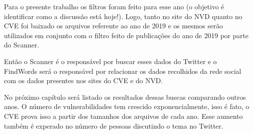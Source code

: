 Para o presente trabalho os filtros foram feito para esse ano (o objetivo é identificar como a discussão está hoje!). Logo, tanto no site do NVD quanto no CVE foi baixado os arquivos referente ao ano de 2019 e os mesmos serão utilizados em conjunto com o filtro feito de publicações do ano de 2019 por parte do Scanner.

Então o Scanner é o responsável por buscar esses dados do Twitter e o FindWords será o responsável por relacionar os dados recolhidos da rede social com os dados presentes nos sites do CVE e do NVD.

No próximo capítulo será listado os resultados dessas buscas comparando outros anos. O número de vulnerabilidades tem crescido exponencialmente, isso é fato, o CVE prova isso a partir dos tamanhos dos arquivos de cada ano. Esse aumento também é experado no número de pessoas discutindo o tema no Twitter. 

